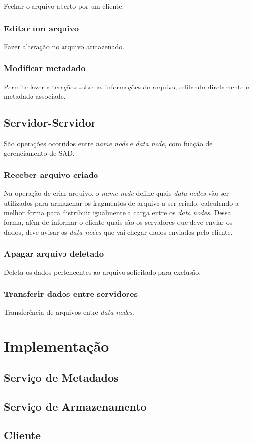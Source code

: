 	Fechar o arquivo aberto por um cliente.
	
	\subsubsection{Editar um arquivo}
	
	Fazer alteração no arquivo armazenado.
	
	\subsubsection{Modificar metadado}
	
	Permite fazer alterações sobre as informações do arquivo, editando diretamente o metadado associado.
	
	
	\subsection{Servidor-Servidor}
	São operações ocorridos entre \textit{name node} e \textit{data node}, com função de gerenciamento de SAD.
	
	\subsubsection{Receber arquivo criado}
	
	Na operação de criar arquivo, o \textit{name node} define quais \textit{data nodes} vão ser utilizados para armazenar os fragmentos de arquivo a ser criado, calculando a melhor forma para distribuir igualmente a carga entre os \textit{data nodes}. Dessa forma, além de informar o cliente quais são os servidores que deve enviar os dados, deve avisar os \textit{data nodes} que vai chegar dados enviados pelo cliente.
	
	\subsubsection{Apagar arquivo deletado}
	
	Deleta os dados pertencentes ao arquivo solicitado para exclusão.
	
	\subsubsection{Transferir dados entre servidores}
	
	Transferência de arquivos entre \textit{data nodes}.
	
	
	\section{Implementação}
	
	\subsection{Serviço de Metadados}
	
	\subsection{Serviço de Armazenamento}
	
	\subsection{Cliente}
	
	
	
	